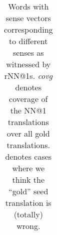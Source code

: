 \documentclass[11pt]{article}
\begin{document}
\begin{table}
{\begin{tabular}{llll}
    \bottomrule
  \end{tabular}
  }
  \caption{Words with sense vectors corresponding to different senses as
  witnessed by rNN@1s.  \emph{covg} denotes coverage of the NN@1 translations
  over all gold translations.  \bad denotes cases where we think the ``gold''
  seed translation is (totally) wrong.
  }
  \label{tab:alkoto}
\end{table}
\end{document}
